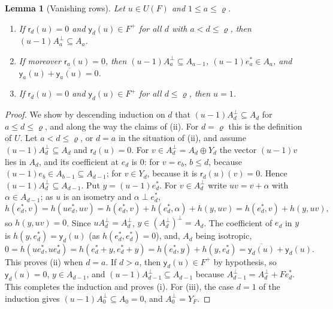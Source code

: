 \documentclass[10pt]{amsart}
\newtheorem{lemma}[theorem]{Lemma}
\theoremstyle{definition}
\theoremstyle{remark}
\providecommand{\aubar}[1]{\overline{#1}}
\begin{document}
\begin{lemma}[Vanishing rows]\label{pbv:rows}
Let $u\in U(F)$ and $1\le a\le\varrho$.
\begin{enumerate}
\item[(i)] If $\mathsf r_d(u)=0$ and $\mathsf y_d(u)\in F^+$ for all $d$ with $a<d\le\varrho$, then
$(u-1)A_a^\perp\subseteq A_a$.
\item[(ii)] If moreover $\mathsf r_a(u)=0$, then $(u-1)A_a^\perp\subseteq A_{a-1}$, $(u-1)e_a^*\in A_a$, and
$\mathsf y_a(u)+\aubar{\mathsf y_a(u)}=0$.
\item[(iii)] If $\mathsf r_d(u)=0$ and $\mathsf y_d(u)\in F^+$ for all $d\le\varrho$, then $u=1$.
\end{enumerate}
\end{lemma}
\begin{proof}
We show by descending induction on $d$ that $(u-1)A_d^\perp\subseteq A_d$ for $a\le d\le\varrho$, and
along the way the claims of (ii). For $d=\varrho$ this is the definition of $U$. Let $a<d\le\varrho$, or
$d=a$ in the situation of (ii), and assume $(u-1)A_d^\perp\subseteq A_d$ and $\mathsf r_d(u)=0$. For $v\in
A_d^\perp=A_d\oplus Y_d$ the vector $(u-1)v$ lies in $A_d$, and its coefficient at $e_d$ is $0$: for
$v=e_b$, $b\le d$, because $(u-1)e_b\in A_{b-1}\subseteq A_{d-1}$; for $v\in Y_d$, because it is
$\mathsf r_d(u)(v)=0$. Hence $(u-1)A_d^\perp\subseteq A_{d-1}$. Put $y=(u-1)e_d^*$. For $v\in A_d^\perp$
write $uv=v+\alpha$ with $\alpha\in A_{d-1}$; as $u$ is an isometry and $\alpha\perp e_d^*$,
\[
h(e_d^*,v)=h(ue_d^*,uv)=h(e_d^*,v)+h(e_d^*,\alpha)+h(y,uv)=h(e_d^*,v)+h(y,uv),
\]
so $h(y,uv)=0$. Since $uA_d^\perp=A_d^\perp$, $y\in(A_d^\perp)^\perp=A_d$. The coefficient of $e_d$ in $y$ is
$h(y,e_d^*)=\mathsf y_d(u)$ (as $h(e_d^*,e_d^*)=0$), and, $A_d$ being isotropic,
\[
0=h(ue_d^*,ue_d^*)=h(e_d^*+y,e_d^*+y)=h(e_d^*,y)+h(y,e_d^*)=\aubar{\mathsf y_d(u)}+\mathsf y_d(u).
\]
This proves (ii) when $d=a$. If $d>a$, then $\mathsf y_d(u)\in F^+$ by hypothesis, so $\mathsf y_d(u)=0$, $y\in
A_{d-1}$, and $(u-1)A_{d-1}^\perp\subseteq A_{d-1}$ because $A_{d-1}^\perp=A_d^\perp+Fe_d^*$. This completes the
induction and proves (i). For (iii), the case $d=1$ of the induction gives $(u-1)A_0^\perp\subseteq
A_0=0$, and $A_0^\perp=Y_F$.
\end{proof}
\end{document}
